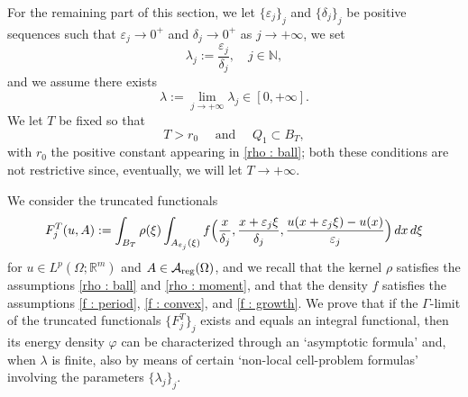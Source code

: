\documentclass{article}
\theoremstyle{definition}
\newcommand{\f}{\varphi}
\newcommand{\ej}{\varepsilon_j}
\newcommand{\dej}{\delta_j}
\newcommand{\N}{\mathbb{N}}
\newcommand{\R}{\mathbb{R}}
\newcommand{\A}{\mathcal{A}}
\begin{document}
For the remaining part of this section, we let $\{\ej\}_j$ and $\{\dej\}_j$ be positive sequences such that $\ej\to 0^+$ and $\dej\to0^+$ as $j\to+\infty$, we set
\begin{equation*}
    \lambda_j:=\frac{\ej}{\dej}, \quad j\in\N,
\end{equation*}
and we assume there exists
\begin{equation*}
\lambda:=\lim_{j\to+\infty}\lambda_j\in[0,+\infty].
\end{equation*}
We let $T$ be fixed so that
\begin{equation*}
    T>r_0 \quad \text{ and } \quad Q_1\subset B_T,
\end{equation*}
with $r_0$ the positive constant appearing in \eqref{rho : ball}; both these conditions are not restrictive since, eventually, we will let $T\to+\infty$.

We consider the truncated functionals 
\begin{equation*}
 F^T_j(u,A)  := \int_{B_T} \rho(\xi)\int_{A_{\ej}(\xi)} f\Bigl(\frac{x}{\dej},\frac{x+\ej\xi}{\dej},\frac{u(x+\ej\xi)-u(x)}{\ej}\Bigr)\, dx\,d\xi   
\end{equation*}
 for $u\in L^p(\Omega; \R^m)$ and $A\in \A_{\rm reg}(\Omega)$, and we recall that the kernel $\rho$ satisfies the assumptions \eqref{rho : ball} and \eqref{rho : moment}, and that the density $f$ satisfies the assumptions \eqref{f : period}, \eqref{f : convex}, and \eqref{f : growth}. We prove that if the $\Gamma$-limit of the truncated functionals $\{F_j^T\}_j$ exists and equals an integral functional, then its energy density $\f$ can be characterized through an `asymptotic formula' and, when $\lambda$ is finite, also by means of certain `non-local cell-problem formulas' involving the parameters $\{\lambda_j\}_j$. 
\end{document}
